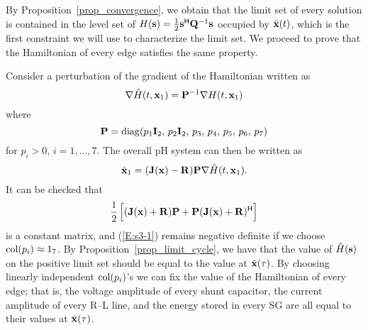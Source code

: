 By Proposition~\ref{prop_convergence}, we obtain that the limit set of every solution is contained in the level set of $H(\mathbf{s}) = \frac{1}{2} \mathbf{s}^{\mathsf{H}} \mathbf{Q}^{-1} \mathbf{s}$ occupied by $\bar{\mathbf{x}}(t)$, which is the first constraint we will use to characterize the limit set. We proceed to prove that the Hamiltonian of every edge satisfies the same property.

Consider a perturbation of the gradient of the Hamiltonian written as
\begin{equation*}
    \nabla \hat H(t, \mathbf{x}_1) = \mathbf{P}^{-1} \nabla H(t, \mathbf{x}_1)
\end{equation*}
where
\begin{equation*}
    \mathbf{P} = \mathrm{diag}(p_1 \mathbf{I}_2,\, p_2 \mathbf{I}_2,\, p_3,\, p_4,\, p_5,\, p_6,\, p_7 )
\end{equation*}
for $p_i > 0,\, i = 1,\ldots, 7$. The overall pH system can then be written as
\begin{equation*}
    \dot{\mathbf{x}}_1 = (\mathbf{J}(\mathbf{x}) - \mathbf{R} ) \mathbf{P} \nabla \hat H(t, \mathbf{x}_1).
\end{equation*}
It can be checked that
\begin{equation} \label{E:s3-1}
    \frac{1}{2} \left[(\mathbf{J}(\mathbf{x}) + \mathbf{R} ) \mathbf{P} + \mathbf{P} (\mathbf{J}(\mathbf{x}) + \mathbf{R})^{\mathsf{H}}\right]
\end{equation}
is a constant matrix, and (\ref{E:s3-1}) remains negative definite if we choose $\operatorname*{col}(p_i) \approx 1_7$. By Proposition~\ref{prop_limit_cycle}, we have that the value of $\hat H(\mathbf{s})$ on the positive limit set should be equal to the value at $\bar{\mathbf{x}}(\tau)$. By choosing linearly independent $\operatorname*{col}(p_i)$'s we can fix the value of the Hamiltonian of every edge; that is, the voltage amplitude of every shunt capacitor, the current amplitude of every R--L line, and the energy stored in every SG are all equal to their values at $\bar{\mathbf{x}}(\tau)$.

